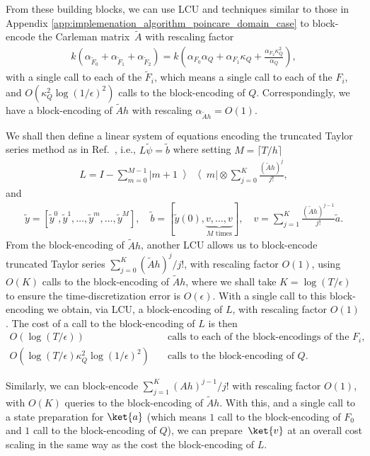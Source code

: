 \documentclass[superscriptaddress,onecolumn,nofootinbib,longbibliography,a4paper,accepted=2026-09-29]{quantumarticle}
\theoremstyle{plain}
\theoremstyle{definition}
\numberwithin{thm}{section}
\numberwithin{assumption}{section}
\numberwithin{lemma}{section}
\numberwithin{prop}{section}
\numberwithin{cor}{section}
\numberwithin{definition}{section}
\numberwithin{rmk}{section}
\numberwithin{equation}{section}
\newcommand{\ketbra}[2]   {\left|#1\middle\rangle\!\middle\langle#2\right|}
\begin{document}
From these building blocks, we can use LCU and techniques similar to those in Appendix \ref{app:implemenation_algorithm_poincare_domain_case} to block-encode the Carleman matrix~$\tilde{A}$ with rescaling factor 
\begin{align}
    k \left(\alpha_{\tilde{F}_0} + \alpha_{\tilde{F}_1} + \alpha_{\tilde{F}_2}\right) = k \left(\alpha_{F_0} \alpha_Q + \alpha_{F_1} \kappa_Q + \frac{\alpha_{F_2} \kappa_Q^2}{\alpha_Q}\right),
\end{align} 
with a single call to each of the $\tilde{F}_i$, which means a single call to each of the $F_i$, and $O(\kappa_Q^2 \log(1/\epsilon)^2)$ calls to the block-encoding of $Q$. Correspondingly, we have a block-encoding of $\tilde{A} h$ with rescaling $\alpha_{\tilde{A} h} = O(1)$. 

We shall then define a linear system of equations encoding the truncated Taylor series method as in Ref.~\cite{berry2015simulating}, i.e., $
    L \tilde{\psi} = \tilde{b}$
where setting $M = \lceil T/h \rceil$
\begin{align}
    L = I -\sum_{m=0}^{M-1} \ketbra{m+1}{m} \otimes \sum_{j=0}^K \frac{(\tilde{A}h)^j}{j!},
\end{align}
and
\begin{align}
\tilde{y} = [ \tilde{y}^{0}, \tilde{y}^{1}, \dots, \tilde{y}^{m}, \dots, \tilde{y}^{M}], \quad 
    \tilde{b} = [ \tilde{y}(0), \underbrace{v, \dots, v}_{M \textrm{ times}}], \quad v = \sum_{j=1}^K \frac{(\tilde{A}h)^{j-1}}{j!} \tilde{a}. 
\end{align}
From the block-encoding of $\tilde{A}h$, another LCU allows us to block-encode truncated Taylor series $\sum_{j=0}^K (\tilde{A}h)^j/j!$, with rescaling factor $O(1)$, using $O(K)$ calls to the block-encoding of $\tilde{A}h$, where we shall take $K= \log (T/\epsilon)$ to ensure the time-discretization error is $O(\epsilon)$. With a single call to this block-encoding we obtain, via LCU, a block-encoding of $L$, with rescaling factor $O(1)$. The cost of a call to the block-encoding of $L$ is  then
\begin{align}
O(\log(T/\epsilon)) & \quad \textrm{calls to each of the block-encodings of the } F_i, \\
O(\log(T/\epsilon) \kappa^2_Q \log(1/\epsilon)^2) & \quad  \textrm{calls to the block-encoding of } Q.
\end{align}

Similarly, we can block-encode $\sum_{j=1}^K (Ah)^{j-1}/j!$ with rescaling factor $O(1)$, with $O(K)$ queries to the block-encoding of $\tilde{A}h$. With this, and a single call to a state preparation for $\ket{a}$ (which means $1$ call to the block-encoding of $F_0$ and $1$ call to the block-encoding of $Q$), we can  prepare~$\ket{v}$ at an overall cost scaling in the same way as the cost the block-encoding of $L$. 
\end{document}

